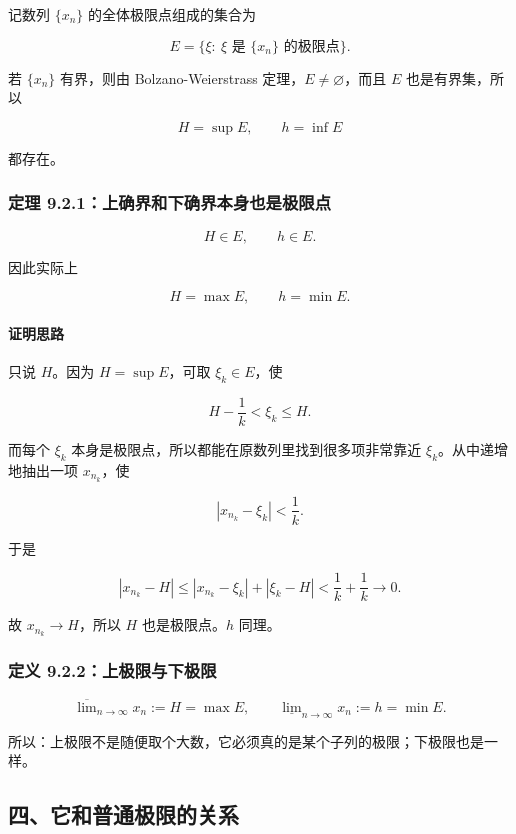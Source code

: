 记数列 \(\{x_n\}\) 的全体极限点组成的集合为

\[
      E=\{\xi:\ \xi \text{ 是 } \{x_n\}\text{ 的极限点}\}.
    \]

若 \(\{x_n\}\) 有界，则由 Bolzano-Weierstrass 定理，\(E\neq\varnothing\)，而且 \(E\) 也是有界集，所以

\[
      H=\sup E,\qquad h=\inf E
    \]

都存在。

\subsubsection*{定理 9.2.1：上确界和下确界本身也是极限点}

\[
      H\in E,\qquad h\in E.
    \]

因此实际上

\[
      H=\max E,\qquad h=\min E.
    \]

\paragraph*{证明思路}

只说 \(H\)。因为 \(H=\sup E\)，可取 \(\xi_k\in E\)，使

\[
      H-\frac1k<\xi_k\le H.
    \]

而每个 \(\xi_k\) 本身是极限点，所以都能在原数列里找到很多项非常靠近 \(\xi_k\)。从中递增地抽出一项 \(x_{n_k}\)，使

\[
      |x_{n_k}-\xi_k|<\frac1k.
    \]

于是

\[
      |x_{n_k}-H|
      \le
      |x_{n_k}-\xi_k|+|\xi_k-H|
      <
      \frac1k+\frac1k
      \to0.
    \]

故 \(x_{n_k}\to H\)，所以 \(H\) 也是极限点。\(h\) 同理。

\subsubsection*{定义 9.2.2：上极限与下极限}

\[
      \overline{\lim}_{n\to\infty}x_n:=H=\max E,
      \qquad
      \underline{\lim}_{n\to\infty}x_n:=h=\min E.
    \]

\begin{notebox}
所以：上极限不是随便取个大数，它必须真的是某个子列的极限；下极限也是一样。
\end{notebox}

\subsection*{四、它和普通极限的关系}

